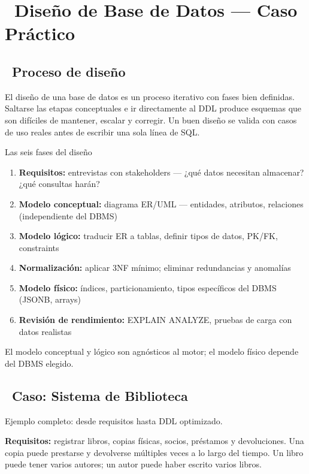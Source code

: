 \chapter[Diseño de Base de Datos --- Caso Práctico]{~Diseño de Base de Datos --- Caso Práctico}

\section[Proceso de diseño]{~Proceso de diseño}

El diseño de una base de datos es un proceso iterativo con fases bien definidas.
Saltarse las etapas conceptuales e ir directamente al DDL produce esquemas que son difíciles de mantener, escalar y corregir.
Un buen diseño se valida con casos de uso reales antes de escribir una sola línea de SQL.

\begin{teoriabox}{Las seis fases del diseño}
\begin{enumerate}
  \item \textbf{Requisitos:} entrevistas con stakeholders --- ¿qué datos necesitan almacenar? ¿qué consultas harán?
  \item \textbf{Modelo conceptual:} diagrama ER/UML --- entidades, atributos, relaciones (independiente del DBMS)
  \item \textbf{Modelo lógico:} traducir ER a tablas, definir tipos de datos, PK/FK, constraints
  \item \textbf{Normalización:} aplicar 3NF mínimo; eliminar redundancias y anomalías
  \item \textbf{Modelo físico:} índices, particionamiento, tipos específicos del DBMS (JSONB, arrays)
  \item \textbf{Revisión de rendimiento:} EXPLAIN ANALYZE, pruebas de carga con datos realistas
\end{enumerate}
El modelo conceptual y lógico son agnósticos al motor; el modelo físico depende del DBMS elegido.
\end{teoriabox}

\section[Caso: Sistema de Biblioteca]{~Caso: Sistema de Biblioteca}

Ejemplo completo: desde requisitos hasta DDL optimizado.

\textbf{Requisitos:} registrar libros, copias físicas, socios, préstamos y devoluciones.
Una copia puede prestarse y devolverse múltiples veces a lo largo del tiempo.
Un libro puede tener varios autores; un autor puede haber escrito varios libros.

